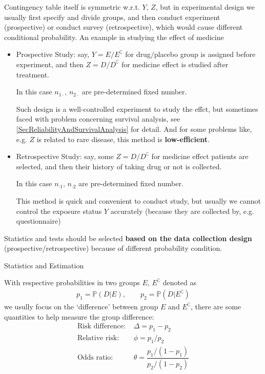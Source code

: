     Contingency table itself is symmetric w.r.t. $ Y,\,Z $, but in experimental design we usually first specify and divide groups, and then conduct experiment (prospective) or conduct survey (retrospective), which would cause different conditional probability. An example in studying the effect of medicine
    \begin{itemize}[topsep=2pt,itemsep=0pt]
        \item Prospective Study: say, $ Y=E\big/E^\complement $ for drug$ \big/ $placebo group is assigned before experiment, and then $ Z=D\big/D^\complement $ for medicine effect is studied after treatment. 
        
        In this case $ n_{1\cdot },\,n_{2\cdot } $ are pre-determined fixed number.

        Such design is a well-controlled experiment to study the effct, but sometimes faced with problem concerning survival analysis, see \autoref{SecReliabilityAndSurvivalAnalysis} for detail. And for some problems like, e.g. $ Z $ is related to rare disease, this method is \textbf{low-efficient}.

        \item Retrospective Study: say, some $ Z=D\big/D^\complement $ for medicine effect patients are selected, and then their history of taking drug or not is collected.
        
        In this case $ n_{\cdot 1},\,n_{\cdot 2} $ are pre-determined fixed number.

        This method is quick and convenient to conduct study, but usually we cannot control the exposure status $ Y $ accurately (because they are collected by, e.g. questionnaire)
    \end{itemize}

    Statistics and tests should be selected \textbf{based on the data collection design} (prospective/retrospective) because of different probability condition.
    
\begin{point}
    Statistics and Estimation
\end{point}


    With respective probabilities in two groups $ E,\,E^\complement $ denoted as
    \begin{align}
        p_1=\mathbb{P}\left( D|E \right),\qquad p_2=\mathbb{P}\left( D|E^\complement \right)   
    \end{align}
        we usully focus on the `difference' between group $ E $ and $ E^\complement $, there are some quantities to help measure the group difference:
\begin{align}
    \text{Risk difference: }&\Delta =p_1-p_2\\
    \text{Relative risk: }&\phi=p_1\big/p_2\\
    \text{Odds ratio: }&\theta=\dfrac{p_1/(1-p_1)}{p_2/(1-p_2)}
\end{align}

